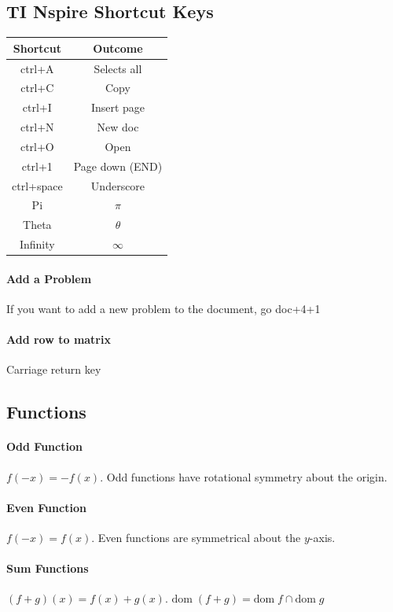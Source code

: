 \documentclass[a4paper,twoside,10pt]{article}
\begin{document}
	\subsection{TI Nspire Shortcut Keys}
	\begin{minipage}{0.5\textwidth}
		\begin{tabular}{|c|c|}
			\hline
			\textbf{Shortcut} & \textbf{Outcome} \\
			\hline
			ctrl+A & Selects all\\
			\hline
			ctrl+C & Copy \\
			\hline
			ctrl+I & Insert page \\
			\hline
			ctrl+N & New doc \\
			\hline
			ctrl+O & Open \\
			\hline
			ctrl+1 & Page down (END)\\
			\hline
			ctrl+space & Underscore \\
			\hline
			Pi & $\pi$ \\
			\hline
			Theta & $\theta$ \\
			\hline
			Infinity & $\infty$ \\
			\hline
		\end{tabular}
	\end{minipage}
	\hfill
	\begin{minipage}{0.5\textwidth}
		\paragraph{Add a Problem} If you want to add a new problem to the document, go doc+4+1
		\paragraph{Add row to matrix} Carriage return key
	\end{minipage}
	\subsection{Functions}
	\paragraph{Odd Function} $f(-x)=-f(x)$. Odd functions have rotational symmetry about the origin.
	\paragraph{Even Function} $f(-x)=f(x)$. Even functions are symmetrical about the $y$-axis.
	\paragraph{Sum Functions} $(f+g)(x)=f(x)+g(x)$. $\mathrm{dom}\;(f+g)=\mathrm{dom}\;f\cap\mathrm{dom}\;g$
\end{document}
